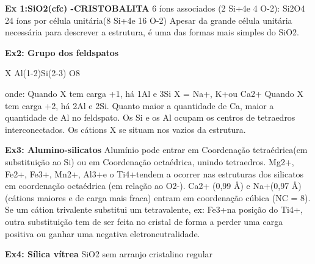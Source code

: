 \textbf{Ex 1:SiO2(cfc) -CRISTOBALITA}
6 íons associados (2 Si+4e 4 O-2): Si2O4
24 íons por célula unitária(8 Si+4e 16 O-2)
Apesar da grande célula unitária necessária para descrever a estrutura, é uma das formas mais simples do SiO2.


\textbf{Ex2: Grupo dos feldspatos}

X Al(1-2)Si(2-3) O8


onde: Quando X tem carga +1, há 1Al e 3Si X = Na+, K+ou Ca2+ Quando X tem carga +2, há 2Al e 2Si. Quanto maior a quantidade de Ca, maior a quantidade de Al no feldspato. Os Si e os Al ocupam os centros de tetraedros interconectados. Os cátions X se situam nos vazios da estrutura.



\textbf{Ex3: Alumino-silicatos}
Alumínio pode entrar em Coordenação tetraédrica(em substituição ao Si) ou em Coordenação octaédrica, unindo tetraedros.
Mg2+, Fe2+, Fe3+, Mn2+, Al3+e o Ti4+tendem a ocorrer nas estruturas dos silicatos em coordenação octaédrica (em relação ao O2-).
Ca2+ (0,99 Å) e Na+(0,97 Å) (cátions maiores e de carga mais fraca) entram em coordenação cúbica (NC = 8).
Se um cátion trivalente substitui um tetravalente, ex: Fe3+na posição do Ti4+, outra substituição tem de ser feita no cristal de forma a perder uma carga positiva ou ganhar uma negativa eletroneutralidade.


\textbf{Ex4: Sílica vítrea}
SiO2 sem arranjo cristalino regular
